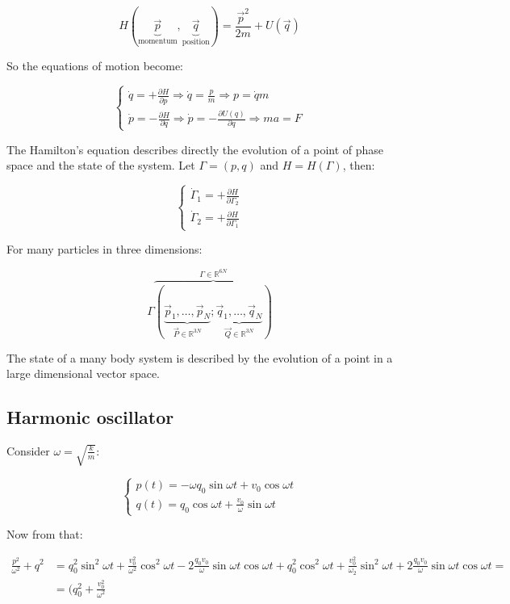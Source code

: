   $$H(\underbrace{\vec{p}}_{\text{momentum}}, \underbrace{\vec{q}}_{\text{position}}) = \frac{\vec{p}^2}{2m} + U(\vec{q})$$

  So the equations of motion become:

  $$\begin{cases}
    \dot{q} = + \frac{\partial {H}}{\partial {p}}\Rightarrow \dot{q} = \frac{p}{m}\Rightarrow p = \dot{q}m\\
    \dot{p} = - \frac{\partial {H}}{\partial {q}}\Rightarrow \dot{p} = -\frac{\partial {U(q)}}{\partial {q}}\Rightarrow ma = F
  \end{cases}$$

  The Hamilton's equation describes directly the evolution of a point of phase space and the state of the system.
  Let $\Gamma = (p,q)$ and $H = H(\Gamma)$, then:

  $$\begin{cases}
    \dot{\Gamma}_1 = +\frac{\partial {H}}{\partial {\Gamma_2}}\\
    \dot{\Gamma}_2 = +\frac{\partial {H}}{\partial {\Gamma_1}}
  \end{cases}$$

  For many particles in three dimensions:

  $$\Gamma\overbrace{(\underbrace{\vec{p}_1,\dots,\vec{p}_N}_{\vec{P}\in \mathbb{R}^{3N}};\underbrace{\vec{q}_1,\dots,\vec{q}_N}_{\vec{Q}\in \mathbb{R}^{3N}})}^{\Gamma\in \mathbb{R}^{6N}}$$

  The state of a many body system is described by the evolution of a point in a large dimensional vector space.

  \subsection{Harmonic oscillator}
  Consider $\omega = \sqrt{\frac{k}{m}}$:

  $$\begin{cases}
    p(t) = -\omega q_0\sin\omega t + v_0\cos\omega t\\
    q(t) = q_0\cos\omega t + \frac{v_0}{\omega}\sin\omega t
  \end{cases}$$

  Now from that:

  \begin{align*}
    \frac{p^2}{\omega^2}+q^2 &= q_0^2\sin^2\omega t + \frac{v_0^2}{\omega^2}\cos^2\omega t - 2 \frac{q_0v_0}{\omega}\sin \omega t\cos \omega t + q_0^2\cos^2\omega t + \frac{v_0^2}{\omega_2}\sin^2\omega t + 2\frac{q_0v_0}{\omega}\sin \omega t\cos \omega t =\\
                             &=(q_0^2+\frac{v_0^2}{\omega^2}
  \end{align*}

